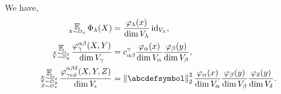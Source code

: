 \documentclass[notitlepage, 11pt, letterpaper]{amsart}
\begin{document}
\begin{prop}
    \label{prop:random_matrices}
    We have,
    \begin{align}
        \begin{split}
            \tightsinglesubstack{\expect}{X \sim \orbit_{\ex}}\, \Phi_\yx(X)
            &= \frac{\vp_\yx(x)}{\dim V_\yx}  \id_{V_\yx}, \\
            \tightdoublesubstack{\expect}{X \sim \orbit_{\ex}}{Y \sim \orbit_{\ey}}\,  \frac{\vp^{\ya \yb}_\yc(X, Y)}{\dim V_\yc}
            &= c_{\ya \yb}^\yc \frac{\vp_\ya(x)}{\dim V_\ya}\frac{\vp_\yb(y)}{\dim V_\yb}, \\
            \tighttriplesubstack{\expect}{X \sim \orbit_{\ex}}{Y \sim \orbit_{\ey}}{Z \sim \orbit_{\ez}}\, \frac{\vp^{\ya \yb \yd}_{\yc \ye \yf}(X, Y, Z)}{\dim V_\ye}
            &= \norm{\abcdefsymbol}_2^2 \frac{\vp_\ya(x)}{\dim V_\ya}\frac{\vp_\yb(y)}{\dim V_\yb}
            \frac{\vp_\yd(y)}{\dim V_\yd}.
        \end{split}
    \end{align}
\end{prop}
\end{document}
